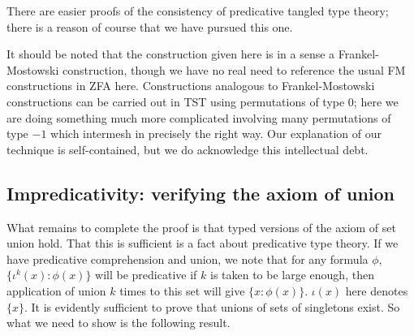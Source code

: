 \documentclass[112pt]{article}
\theoremstyle{definition}
\theoremstyle{remark}
\newcommand{\rk}[1]{{\color{blue}\sl #1}}
\begin{document}
There are easier proofs of the consistency of predicative tangled type theory; %
there is a reason of course that we have pursued this one.

It should be noted that the construction given here is in a sense a Frankel-Mostowski construction, though we have no real need to reference the usual
FM constructions in ZFA here.  Constructions analogous to Frankel-Mostowski constructions can be carried out in TST using permutations of type 0;  here we are doing something much more complicated involving many permutations of type $-1$ which intermesh in precisely the right way.  Our explanation of our technique is self-contained, but we do acknowledge this intellectual debt.



\newpage
\subsection{Impredicativity:  verifying the axiom of union}\label{ss:impredicativity}

What remains to complete the proof is that typed versions of the axiom of set union hold.  That this is sufficient is a fact about predicative type theory.
If we have predicative comprehension and union, we note that for any formula $\phi$, $\{\iota^k(x):\phi(x)\}$ will be predicative if $k$ is taken to be large enough, then application of union $k$ times to this set will give $\{x:\phi(x)\}$.  $\iota(x)$ here denotes $\{x\}$.  It is evidently sufficient to prove that unions of sets of singletons exist.
{So what we need to show is the following result.}
\end{document}

